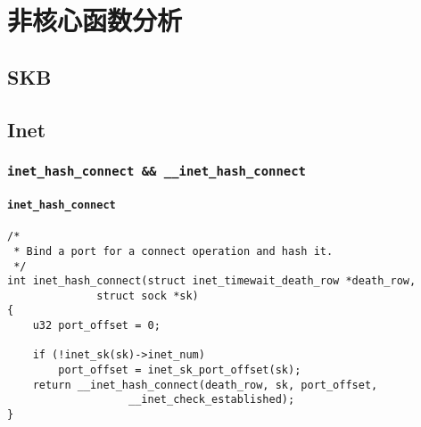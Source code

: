 \chapter{非核心函数分析}

\minitoc

\section{SKB}

\section{Inet}
    \subsection{\texttt{inet_hash_connect && __inet_hash_connect}}

        \subsubsection{\texttt{inet_hash_connect}}
\begin{verbatim}
/*
 * Bind a port for a connect operation and hash it.
 */
int inet_hash_connect(struct inet_timewait_death_row *death_row,
              struct sock *sk)
{
    u32 port_offset = 0;

    if (!inet_sk(sk)->inet_num)
        port_offset = inet_sk_port_offset(sk);
    return __inet_hash_connect(death_row, sk, port_offset,
                   __inet_check_established);
}
\end{verbatim}

